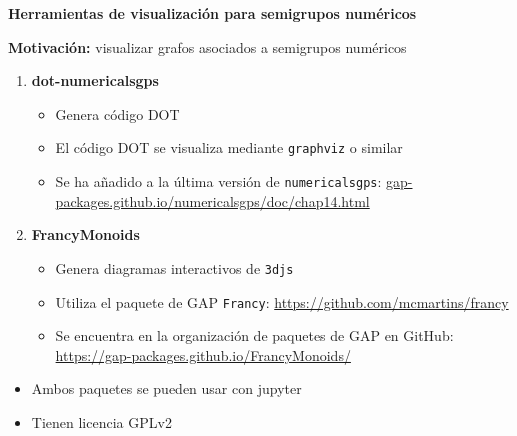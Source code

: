 \documentclass[10pt,compress]{beamer}
\begin{document}
\begin{frame}
  \begin{center}
  {\color{ChetwodeBlue}\Large\textbf{Herramientas de visualización para semigrupos numéricos}}    
  \end{center}

  \begin{tcolorbox}[colback=ChetwodeBlue!10,colframe=ChetwodeBlue!60]
\textbf{Motivación: } visualizar grafos asociados a semigrupos numéricos
  \end{tcolorbox}
  
\begin{enumerate}
\item \textbf{dot-numericalsgps}  
\begin{itemize}
\item Genera código DOT
\item El código DOT se visualiza mediante \texttt{graphviz} o similar
\item Se ha añadido a la última versión de \texttt{numericalsgps}:
  \url{gap-packages.github.io/numericalsgps/doc/chap14.html}
\end{itemize}
\item \textbf{FrancyMonoids}
\begin{itemize}
\item Genera diagramas interactivos de \texttt{3djs}
\item Utiliza el paquete de GAP \texttt{Francy}:
  \url{https://github.com/mcmartins/francy}
\item Se encuentra en la organización de paquetes de GAP en GitHub:
  \url{https://gap-packages.github.io/FrancyMonoids/}
\end{itemize}
\end{enumerate}

  \begin{tcolorbox}[colback=ChetwodeBlue!10,colframe=ChetwodeBlue!60]
\begin{itemize}
\item Ambos paquetes se pueden usar con jupyter
\item Tienen licencia GPLv2
\end{itemize}
  \end{tcolorbox}
\end{frame}
  
\end{document}

